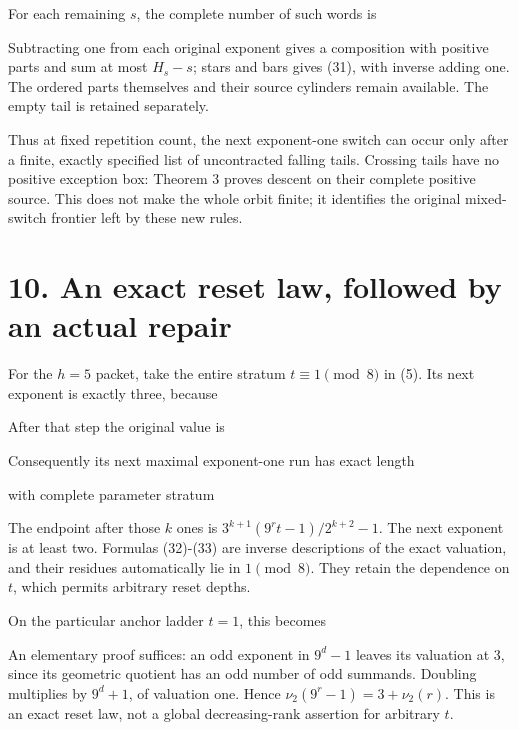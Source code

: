 For each remaining \(s\), the complete number of such words is


Subtracting one from each original exponent gives a composition with
positive parts and sum at most \(H_s-s\); stars and bars gives (31),
with inverse adding one. The ordered parts themselves and their source
cylinders remain available. The empty tail is retained separately.

Thus at fixed repetition count, the next exponent-one switch can occur
only after a finite, exactly specified list of uncontracted falling
tails. Crossing tails have no positive exception box: Theorem 3 proves
descent on their complete positive source. This does not make the whole
orbit finite; it identifies the original mixed-switch frontier left by
these new rules.

\section{10. An exact reset law, followed by an actual repair}

For the \(h=5\) packet, take the entire stratum \(t\equiv1\pmod8\) in
(5). Its next exponent is exactly three, because


After that step the original value is


Consequently its next maximal exponent-one run has exact length


with complete parameter stratum


The endpoint after those \(k\) ones is \(3^{k+1}(9^rt-1)/2^{k+2}-1\).
The next exponent is at least two. Formulas (32)-(33) are inverse
descriptions of the exact valuation, and their residues automatically
lie in \(1\pmod8\). They retain the dependence on \(t\), which permits
arbitrary reset depths.

On the particular anchor ladder \(t=1\), this becomes


An elementary proof suffices: an odd exponent in \(9^d-1\) leaves its
valuation at 3, since its geometric quotient has an odd number of odd
summands. Doubling multiplies by \(9^d+1\), of valuation one. Hence
\(\nu_2(9^r-1)=3+\nu_2(r)\). This is an exact reset law, not a global
decreasing-rank assertion for arbitrary \(t\).

